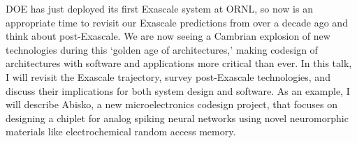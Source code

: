 DOE has just deployed its first Exascale system at ORNL, so now is an appropriate time to revisit our Exascale predictions from over a decade ago and think about post-Exascale. We are now seeing a Cambrian explosion of new technologies during this ‘golden age of architectures,’ making codesign of architectures with software and applications more critical than ever. In this talk, I will revisit the Exascale trajectory, survey post-Exascale technologies, and discuss their implications for both system design and software. As an example, I will describe Abisko, a new microelectronics codesign project, that focuses on designing a chiplet for analog spiking neural networks using novel neuromorphic materials like electrochemical random access memory. 
